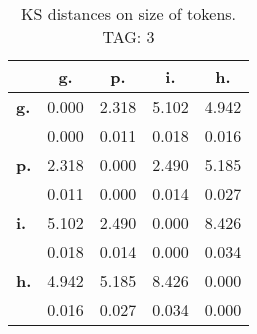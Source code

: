 \begin{table}[h!]
\begin{center}
\begin{tabular}{| l || c | c | c | c |}\hline
 & {\bf g.} & {\bf p.} & {\bf i.} & {\bf h.} \\\hline\hline
{\bf g.} & 0.000 & 2.318 & 5.102 & 4.942 \\
{\bf } & 0.000 & 0.011 & 0.018 & 0.016 \\\hline
{\bf p.} & 2.318 & 0.000 & 2.490 & 5.185 \\
{\bf } & 0.011 & 0.000 & 0.014 & 0.027 \\\hline
{\bf i.} & 5.102 & 2.490 & 0.000 & 8.426 \\
{\bf } & 0.018 & 0.014 & 0.000 & 0.034 \\\hline
{\bf h.} & 4.942 & 5.185 & 8.426 & 0.000 \\
{\bf } & 0.016 & 0.027 & 0.034 & 0.000 \\\hline
\end{tabular}
\caption{KS distances on size of tokens. TAG: 3}
\end{center}
\end{table}